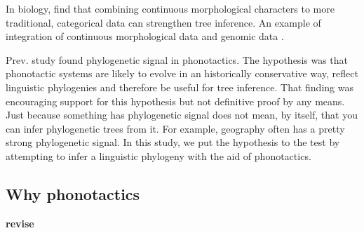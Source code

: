 \documentclass[]{article}
\begin{document}
In biology, \textcite{parins-fukuchi_use_2018} find that combining continuous morphological characters to more traditional, categorical data can strengthen tree inference. An example of integration of continuous morphological data and genomic data \textcite{domel_combining_2019}.

Prev. study \autocite{macklin-cordes_phylogenetic_2020} found phylogenetic signal in phonotactics. The hypothesis was that phonotactic systems are likely to evolve in an historically conservative way, reflect linguistic phylogenies and therefore be useful for tree inference. That finding was encouraging support for this hypothesis but not definitive proof by any means. Just because something has phylogenetic signal does not mean, by itself, that you can infer phylogenetic trees from it. For example, geography often has a pretty strong phylogenetic signal. In this study, we put the hypothesis to the test by attempting to infer a linguistic phylogeny with the aid of phonotactics.

\hypertarget{why-phonotactics}{%
\subsection{Why phonotactics}\label{why-phonotactics}}

\textbf{revise}
\end{document}
